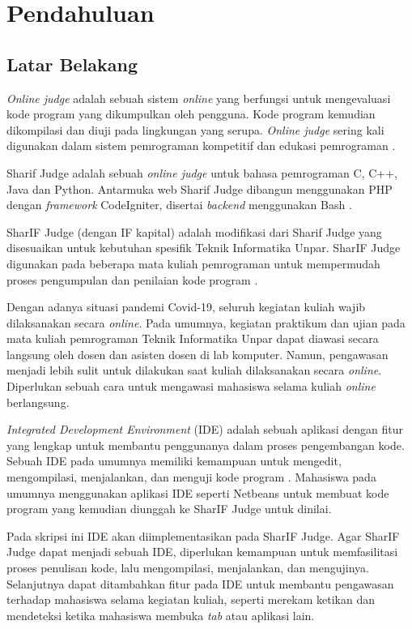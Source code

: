 \chapter{Pendahuluan}
\label{chap:intro}
   
\section{Latar Belakang}
\label{sec:label}

\textit{Online judge} adalah sebuah sistem \textit{online} yang berfungsi untuk mengevaluasi kode program yang dikumpulkan oleh pengguna. Kode program kemudian dikompilasi dan diuji pada lingkungan yang serupa. \textit{Online judge} sering kali digunakan dalam sistem pemrograman kompetitif dan edukasi pemrograman \cite{judge}.

Sharif Judge adalah sebuah \textit{online judge} untuk bahasa pemrograman C, C++, Java dan Python. Antarmuka web Sharif Judge dibangun menggunakan PHP dengan \textit{framework} CodeIgniter, disertai \textit{backend} menggunakan Bash \cite{sharif}.

SharIF Judge (dengan IF kapital) adalah modifikasi dari Sharif Judge yang disesuaikan untuk kebutuhan spesifik Teknik Informatika Unpar. SharIF Judge digunakan pada beberapa mata kuliah pemrograman untuk mempermudah proses pengumpulan dan penilaian kode program \cite{stillmen:sharif}.

Dengan adanya situasi pandemi Covid-19, seluruh kegiatan kuliah wajib dilaksanakan secara \textit{online}. Pada umumnya, kegiatan praktikum dan ujian pada mata kuliah pemrograman Teknik Informatika Unpar dapat diawasi secara langsung oleh dosen dan asisten dosen di lab komputer.  Namun, pengawasan menjadi lebih sulit untuk dilakukan saat kuliah dilaksanakan secara \textit{online}. Diperlukan sebuah cara untuk mengawasi mahasiswa selama kuliah \textit{online} berlangsung. 

{\it Integrated Development Environment} (IDE) adalah sebuah aplikasi dengan fitur yang lengkap untuk membantu penggunanya dalam proses pengembangan kode. Sebuah IDE pada umumnya memiliki kemampuan untuk mengedit, mengompilasi, menjalankan, dan menguji kode program \cite{ide}.  Mahasiswa pada umumnya menggunakan aplikasi IDE seperti Netbeans untuk membuat kode program yang kemudian diunggah ke SharIF Judge untuk dinilai.

Pada skripsi ini IDE akan diimplementasikan pada SharIF Judge. Agar SharIF Judge dapat menjadi sebuah IDE, diperlukan kemampuan untuk memfasilitasi proses penulisan kode, lalu mengompilasi, menjalankan, dan mengujinya. Selanjutnya dapat ditambahkan fitur pada IDE untuk membantu pengawasan terhadap mahasiswa selama kegiatan kuliah, seperti merekam ketikan dan mendeteksi ketika mahasiswa membuka \textit{tab} atau aplikasi lain.

